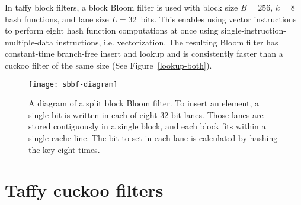 \documentclass[sigconf, nonacm]{acmart}
\begin{document}
In taffy block filters, a block Bloom filter is used with block size $B = 256$, $k = 8$ hash functions, and lane size $L = 32$~bits.
This enables using vector instructions to perform eight hash function computations at once using single-instruction-multiple-data instructions, i.e. vectorization.
The resulting Bloom filter has constant-time branch-free insert and lookup and is consistently faster than a cuckoo filter of the same size (See Figure~\ref{lookup-both}).~\cite{cuckoo-filter-github}



\begin{figure}
  \texttt{[image: sbbf-diagram]}
\caption{\label{sbbf-diagram}
A diagram of a split block Bloom filter.
To insert an element, a single bit is written in each of eight 32-bit lanes.
Those lanes are stored contiguously in a single block, and each block fits within a single cache line.
The bit to set in each lane is calculated by hashing the key eight times.
}
\end{figure}



\section{Taffy cuckoo filters}
\label{tcf}

\end{document}
